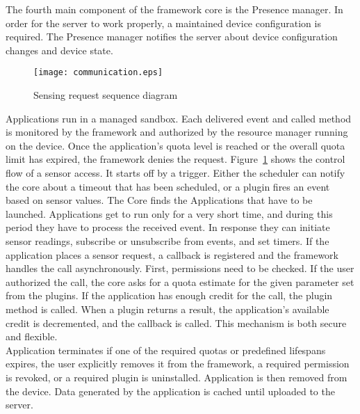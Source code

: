 \documentclass[conference,letterpaper]{IEEEtran}
\begin{document}
\indent The fourth main component of the framework core is the Presence manager. In order for the server to work properly, a maintained device configuration is required. The Presence manager notifies the server about device configuration changes and  device state.
\begin{figure}[h]
\centering
	\texttt{[image: communication.eps]}
	\label{fig:communicationImage}
\caption{Sensing request sequence diagram}
\end{figure}
Applications run in a managed sandbox. Each delivered event and called method is monitored by the framework and authorized by the resource manager running on the device. Once the application's quota level is reached or the overall quota limit has expired, the framework denies the request. Figure~\ref{fig:communicationImage} shows the control flow of a sensor access. It starts off by a trigger. Either the scheduler can notify the core about a timeout that has been scheduled, or a plugin fires an event based on sensor values. The Core finds the Applications that have to be launched. Applications get to run only for a very short time, and during this period they have to process the received event. In response they can initiate sensor readings, subscribe or unsubscribe from events, and set timers. If the application places a sensor request, a callback is registered and the framework handles the call asynchronously. First, permissions need to be checked. If the user authorized the call, the core asks for a quota estimate for the given parameter set from the plugins. If the application has enough credit for the call, the plugin method is called. When a plugin returns a result, the application's available credit is decremented, and the callback is called. This mechanism is both secure and flexible.\\
\indent Application terminates if one of the required quotas or predefined lifespans expires, the user explicitly removes it from the framework, a required permission is revoked, or a required plugin is uninstalled. Application is then removed from the device. Data generated by the application is cached until uploaded to the server.
\end{document}
